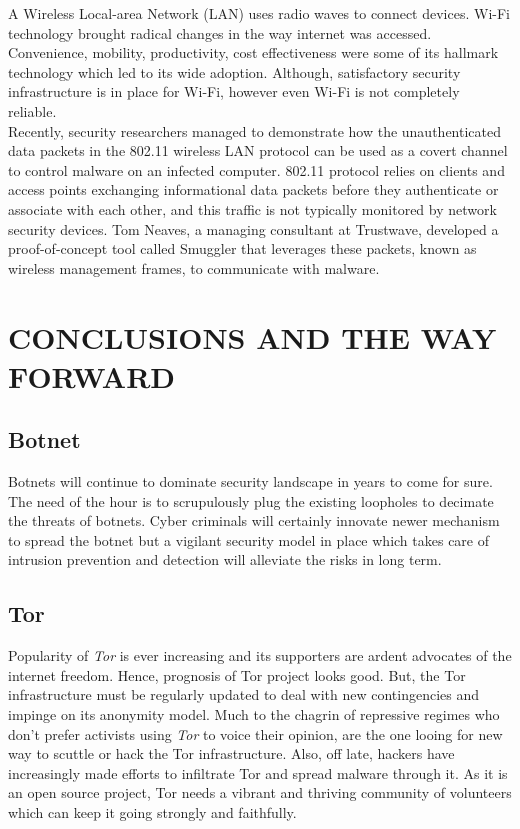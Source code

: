 \documentclass[letterpaper, 10 pt, conference]{ieeeconf}
\begin{document}
A Wireless Local-area Network (LAN) uses radio waves to connect devices. Wi-Fi technology brought radical changes in the way internet was accessed. Convenience, mobility, productivity, cost effectiveness were some of its hallmark technology which led to its wide adoption. Although, satisfactory security infrastructure is in place for Wi-Fi, however even Wi-Fi is not completely reliable.\\

Recently, security researchers managed to demonstrate how the unauthenticated data packets in the 802.11 wireless LAN protocol can be used as a covert channel to control malware on an infected computer. 802.11 protocol relies on clients and access points exchanging informational data packets before they authenticate or associate with each other, and this traffic is not typically monitored by network security devices. Tom Neaves, a managing consultant at Trustwave, developed a proof-of-concept tool called Smuggler that leverages these packets, known as wireless management frames, to communicate with malware.\\

\section{CONCLUSIONS AND THE WAY FORWARD}

\subsection{\textbf{Botnet}}
Botnets will continue to dominate security landscape in years to come for sure. The need of the hour is to scrupulously plug the existing loopholes to decimate the threats of botnets. Cyber criminals will certainly innovate newer mechanism to spread the botnet but a vigilant security model in place which takes care of intrusion prevention and detection will alleviate the risks in long term.\\

\subsection{\textbf{Tor}}

Popularity of \textit{Tor} is ever increasing and its supporters are ardent advocates of the internet freedom. Hence, prognosis of Tor project looks good. But, the Tor infrastructure must be regularly updated to deal with new contingencies and impinge on its anonymity model. Much to the chagrin of repressive regimes who don't prefer activists using \textit{Tor} to voice their opinion, are the one looing for new way to scuttle or hack the Tor infrastructure. Also, off late, hackers have increasingly made efforts to infiltrate Tor and spread malware through it. As it is an open source project, Tor needs a vibrant and thriving community of volunteers which can keep it going strongly and faithfully.\\
\end{document}

